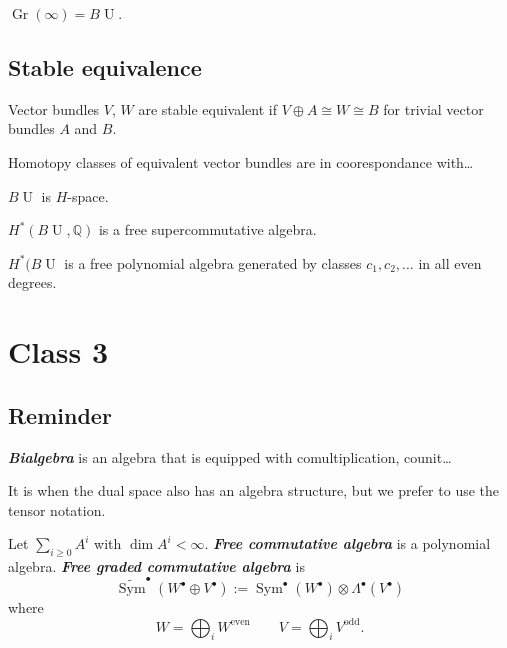 \begin{thm}[Important]\leavevmode
	$\operatorname{Gr}(\infty)=B\operatorname{U}$.
\end{thm}

\subsection{Stable equivalence}

\begin{defn}
	Vector bundles $V$,  $W$ are stable equivalent if  $V\oplus A\cong W\cong B$ for trivial vector bundles  $A$ and $B$.
\end{defn}

Homotopy classes of equivalent vector bundles are in coorespondance with…

\begin{thm}
	$B\operatorname{U}$ is $H$-space.
\end{thm}

\begin{coro}
	$H^* (B\operatorname{U},\mathbb{Q})$ is a free supercommutative algebra.
\end{coro}

\begin{claim}
	$H^*(B\operatorname{U}$ is a free polynomial algebra generated by classes $c_1,c_2,\ldots$ in all even degrees.
\end{claim}

\section{Class 3}

\subsection{Reminder}

\begin{defn}
	\textit{\textbf{Bialgebra}} is an algebra that is  equipped with comultiplication, counit…
\end{defn}

\begin{remark}
	It is when the dual space also has an algebra structure, but we prefer to use the tensor notation.
\end{remark}

Let $\sum_{i \geq 0}A^i$ with $\dim A^i<\infty$. \textit{\textbf{Free commutative algebra}} is a polynomial algebra.  \textit{\textbf{Free graded commutative algebra}} is
\[\widetilde{\operatorname{Sym}}^\bullet(W^\bullet \oplus V^\bullet):=\operatorname{Sym}^\bullet(W^\bullet)\otimes \Lambda^\bullet(V^\bullet)\]
where
\[W=\bigoplus_{i} W^{\operatorname{even}} \qquad V=\bigoplus_{i}V^{\operatorname{odd}}. \]

